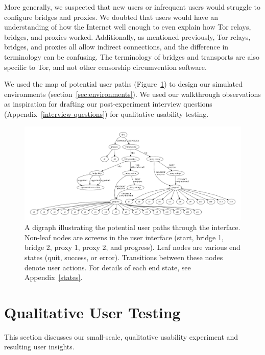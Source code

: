 \documentclass[USenglish,oneside,twocolumn]{article}
\begin{document}
More generally, we suspected that new users or infrequent users would struggle to configure bridges and proxies. We doubted that users would have an understanding of how the Internet well enough to even explain how Tor relays, bridges, and proxies worked. Additionally, as mentioned previously, Tor relays, bridges, and proxies all allow indirect connections, and the difference in terminology can be confusing. The terminology of bridges and transports are also specific to Tor, and not other censorship circumvention software. 

We used the map of potential user paths (Figure~\ref{fig:digraph}) to design our simulated environments (section~\ref{sec:environments}).  We used our walkthrough observations as inspiration for drafting our post-experiment interview questions (Appendix~\ref{interview-questions}) for qualitative usability testing. 

\begin{figure}
\centering
\includegraphics[width=\textwidth]{torconfig.pdf}
\caption{
A digraph illustrating the potential user paths through the interface. Non-leaf nodes are screens in the user interface (start, bridge 1, bridge 2, proxy 1, proxy 2, and progress). Leaf nodes are various end states (quit, success, or error). Transitions between these nodes denote user actions. For details of each end state, see Appendix~\ref{states}. 
}
\label{fig:digraph}
\end{figure} 

\section{Qualitative User Testing}
\label{sec:qualitative}
This section discusses our small-scale, qualitative usability experiment and resulting user insights. 
\end{document}
